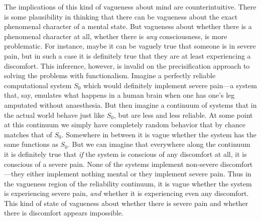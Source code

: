 The implications of this kind of vagueness about mind are counterintuitive. There is some 
plausibility in thinking that there can be vagueness about the exact phenomenal character of a mental 
state. But vagueness about whether there is a phenomenal character at all, whether there is \textit{any} consciousness, is more problematic. For instance,
maybe it can be vaguely true that someone is in severe pain, but in such a case it is definitely true that they are 
at least experiencing a discomfort. This inference, however, is invalid on the precisification approach to solving 
the problems with functionalism. Imagine a perfectly reliable computational system $S_0$ which would definitely implement severe pain---a 
system that, say, emulates what happens in a human brain when one has one's leg amputated without anaesthesia. 
But then imagine a continuum of systems that in the actual world behave just like $S_0$, but are less and less 
reliable. At some point at this continuum we simply have completely random behavior that by chance matches that 
of $S_0$. Somewhere in between it is vague whether the system has the same functions as $S_0$. But we can imagine that 
everywhere along the continuum it is definitely true that \textit{if} the system is conscious of any discomfort at all, it is 
conscious of a severe pain. None of the systems implement non-severe discomfort---they either implement nothing
mental or they implement severe pain. Thus in the vagueness region of the reliability continuum, it is vague whether the system is experiencing
severe pain, \textit{and} whether it is experiencing even any discomfort. This kind of state of vagueness about whether
there is severe pain and whether there is discomfort appears impossible.

